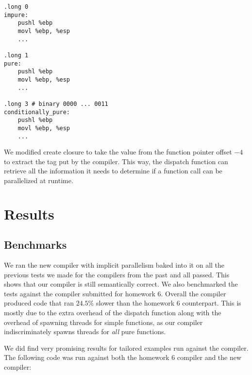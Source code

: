 \documentclass{acm_proc_article-sp}
\begin{document}
\begin{verbatim}
.long 0
impure:
    pushl %ebp
    movl %ebp, %esp
    ...

.long 1
pure:
    pushl %ebp
    movl %ebp, %esp
    ...

.long 3 # binary 0000 ... 0011
conditionally_pure:
    pushl %ebp
    movl %ebp, %esp
    ...
\end{verbatim}

We modified create closure to take the value from the function pointer offset $-4$ to extract the tag
put by the compiler. This way, the dispatch function can retrieve all the information it needs to
determine if a function call can be parallelized at runtime.

\section*{Results}

\subsection*{Benchmarks}
We ran the new compiler with implicit parallelism baked into it on all the previous tests we made for
the compilers from the past and all passed. This shows that our compiler is still semantically correct.
We also benchmarked the tests against the compiler submitted for homework 6. Overall the compiler produced
code that ran $24.5\%$ slower than the homework 6 counterpart. This is mostly due to the extra overhead
of the dispatch function along with the overhead of spawning threads for simple functions, as our compiler
indiscriminately spawns threads for \emph{all} pure functions.

We did find very promising results for tailored examples run against the compiler. The following code was
run against both the homework 6 compiler and the new compiler:
\end{document}
